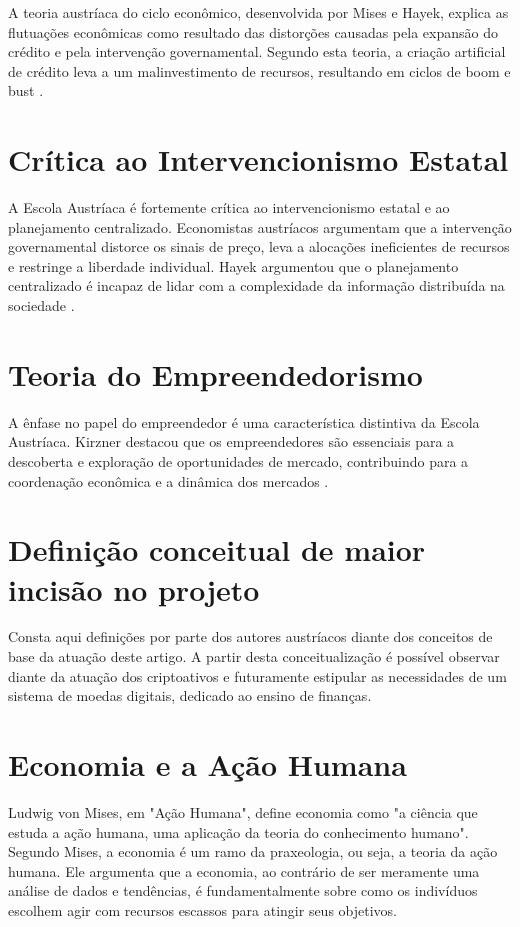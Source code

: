A teoria austríaca do ciclo econômico, desenvolvida por Mises e Hayek, explica as flutuações econômicas como resultado das distorções causadas pela expansão do crédito e pela intervenção governamental. Segundo esta teoria, a criação artificial de crédito leva a um malinvestimento de recursos, resultando em ciclos de boom e bust \cite{mises1949human,hayek1944road}.

\section*{Crítica ao Intervencionismo Estatal}

A Escola Austríaca é fortemente crítica ao intervencionismo estatal e ao planejamento centralizado. Economistas austríacos argumentam que a intervenção governamental distorce os sinais de preço, leva a alocações ineficientes de recursos e restringe a liberdade individual. Hayek argumentou que o planejamento centralizado é incapaz de lidar com a complexidade da informação distribuída na sociedade \cite{hayek1944road,hayek1960constitution}.

\section*{Teoria do Empreendedorismo}

A ênfase no papel do empreendedor é uma característica distintiva da Escola Austríaca. Kirzner destacou que os empreendedores são essenciais para a descoberta e exploração de oportunidades de mercado, contribuindo para a coordenação econômica e a dinâmica dos mercados \cite{kirzner1973competition}.

\section{Definição conceitual de maior incisão no projeto}

Consta aqui definições por parte dos autores austríacos diante dos conceitos de base da atuação deste artigo. A partir desta conceitualização é possível observar diante da atuação dos criptoativos e futuramente estipular as necessidades de um sistema de moedas digitais, dedicado ao ensino de finanças. 

\section*{Economia e a Ação Humana}
Ludwig von Mises, em "Ação Humana"\cite{mises1949human}, define economia como "a ciência que estuda a ação humana, uma aplicação da teoria do conhecimento humano". Segundo Mises, a economia é um ramo da praxeologia, ou seja, a teoria da ação humana. Ele argumenta que a economia, ao contrário de ser meramente uma análise de dados e tendências, é fundamentalmente sobre como os indivíduos escolhem agir com recursos escassos para atingir seus objetivos.

